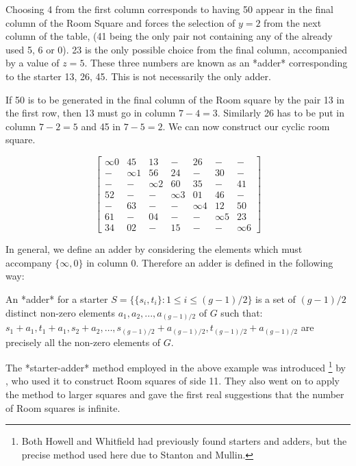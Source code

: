 \documentclass[
  11pt,
  a4paper]{book}\usepackage[]{graphicx}\usepackage[]{xcolor}
\newcounter{example}
\begin{document}
Choosing 4 from the first column corresponds to having 50
appear in the final column of the Room Square and forces the
selection of $y = 2$ from the next column of the table, (41
being the only pair not containing any of the already used
5, 6 or 0). 23 is the only possible choice from the final
column, accompanied by a value of $z = 5$. These three
numbers are known as an *adder* corresponding to the starter
13, 26, 45. This is not necessarily the only adder.

If 50 is to be generated in the final column of the Room
square by the pair 13 in the first row, then 13 must go in
column $7 - 4 = 3$. Similarly 26 has to be put in column
$7 - 2 = 5$ and 45 in $7 - 5 = 2$.  We can now construct our
cyclic room square.

\begin{equation}
  \begin{bmatrix}
    \infty 0 &  45 &  13 &   - &  26 &   - &   - \\
     - &  \infty 1 &  56 &  24 &   - &  30 &   - \\
     - &   - &  \infty 2 &  60 &  35 &   - &  41 \\
    52 &   - &   - &  \infty 3 &  01 &  46 &   - \\
     - &  63 &   - &   - &  \infty 4 &  12 &  50 \\
    61 &   - &  04 &   - &   - &  \infty 5 &  23 \\
    34 &  02 &   - &  15 &   - &   - &  \infty 6 
  \end{bmatrix}
  \label{eq:cyclic-room}
\end{equation}

In general, we define an adder by considering the elements
which must accompany $\{\infty, 0\}$ in column 0. Therefore
an adder is defined in the following way:

An *adder* for a starter
$S = \{\{s_i, t_i\}: 1 \leq i \leq (g - 1)/2 \}$
is a set of $(g - 1)/2$ distinct non-zero elements
$a_1, a_2, ..., a_{(g - 1)/2}$ of $G$ such that:
$s_1 + a_1, t_1 + a_1, s_2 + a_2, \ldots, s_{(g - 1)/2} + a_{(g - 1)/2}, t_{(g - 1)/2} + a_{(g - 1)/2}$
are precisely all the non-zero elements of $G$.

The *starter-adder* method employed in the above example was
introduced
\footnote{Both Howell and Whitfield had previously found starters and adders, but the precise method used here due to Stanton and Mullin.}
by
\cite{stantonConstructionRoomSquares1968},
who used it to construct Room squares of side 11.
They also went on to apply the method to larger squares and
gave the first real suggestions that the number of Room squares
is infinite.
\end{document}
